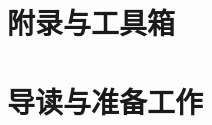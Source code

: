 \documentclass[fontsize=12pt, paper=a4, oneside, DIV=calc]{scrbook}
\theoremstyle{break}
\begin{document}
\chapter{附录与工具箱}


\chapter{导读与准备工作}

























\end{document}

